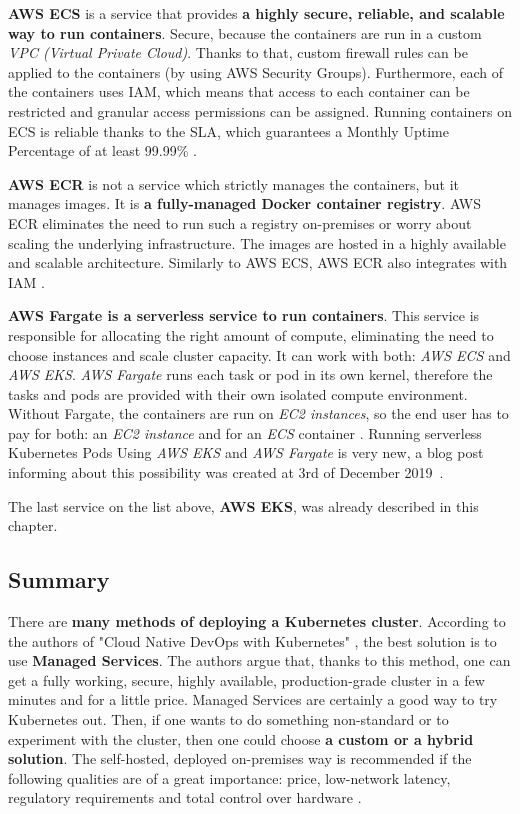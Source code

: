 \textbf{AWS ECS} is a service that provides \textbf{a highly secure, reliable, and scalable way to run containers}. Secure, because the containers are run in a custom \textit{VPC (Virtual Private Cloud)}. Thanks to that, custom firewall rules can be applied to the containers (by using AWS Security Groups). Furthermore, each of the containers uses IAM, which means that access to each container can be restricted and granular access permissions can be assigned. Running containers on ECS is reliable thanks to the SLA, which guarantees a Monthly Uptime Percentage of at least 99.99\% \cite{ecs}.

\textbf{AWS ECR} is not a service which strictly manages the containers, but it manages images. It is \textbf{a fully-managed Docker container registry}. AWS ECR eliminates the need to run such a registry on-premises or worry about scaling the underlying infrastructure. The images are hosted in a highly available and scalable architecture. Similarly to AWS ECS, AWS ECR also integrates with IAM \cite{ecr}.

\textbf{AWS Fargate is a serverless service to run containers}. This service is responsible for allocating the right amount of compute, eliminating the need to choose instances and scale cluster capacity. It can work with both: \textit{AWS ECS} and \textit{AWS EKS}. \textit{AWS Fargate} runs each task or pod in its own kernel, therefore the tasks and pods are provided with their own isolated compute environment. Without Fargate, the containers are run on \textit{EC2 instances}, so the end user has to pay for both: an \textit{EC2 instance} and for an \textit{ECS} container \cite{fargate}. Running serverless Kubernetes Pods Using \textit{AWS EKS} and \textit{AWS Fargate} is very new, a blog post informing about this possibility was created at 3rd of December 2019~\cite{fargate-for-eks}.

The last service on the list above, \textbf{AWS EKS}, was already described in this chapter.

\subsection{Summary}

There are \textbf{many methods of deploying a Kubernetes cluster}. According to the authors of "Cloud Native DevOps with Kubernetes" \cite{book-cndwk}, the best solution is to use \textbf{Managed Services}. The authors argue that, thanks to this method, one can get a fully working, secure, highly available, production-grade cluster in a few minutes and for a little price. Managed Services are certainly a good way to try Kubernetes out. Then, if one wants to do something non-standard or to experiment with the cluster, then one could choose \textbf{a custom or a hybrid solution}. The self-hosted, deployed on-premises way is recommended if the following qualities are of a great importance: price, low-network latency, regulatory requirements and total control over hardware \cite{book-mastering-k8s}.

